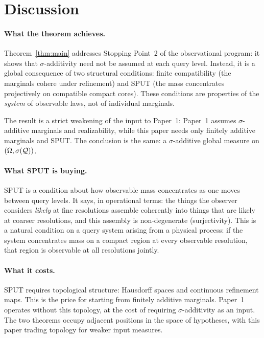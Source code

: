\section{Discussion}\label{sec:discussion}

\paragraph{What the theorem achieves.}
Theorem~\ref{thm:main} addresses Stopping Point~2 of the
observational program: it shows that $\sigma$-additivity need not
be assumed at each query level.  Instead, it is a global consequence
of two structural conditions: finite compatibility (the marginals
cohere under refinement) and SPUT (the mass concentrates
projectively on compatible compact cores).  These conditions are
properties of the \emph{system} of observable laws, not of
individual marginals.

The result is a strict weakening of the input to Paper~1:
Paper~1 assumes $\sigma$-additive marginals and realizability,
while this paper needs only finitely additive marginals and SPUT.
The conclusion is the same: a $\sigma$-additive global measure on
$(\Omega, \sigma(\mathcal{Q}))$.

\paragraph{What SPUT is buying.}
SPUT is a condition about how observable mass concentrates as one
moves between query levels.  It says, in operational terms: the
things the observer considers \emph{likely} at fine resolutions
assemble coherently into things that are likely at coarser
resolutions, and this assembly is non-degenerate (surjectivity).
This is a natural condition on a query system arising from a
physical process: if the system concentrates mass on a compact
region at every observable resolution, that region is observable
at all resolutions jointly.

\paragraph{What it costs.}
SPUT requires topological structure: Hausdorff spaces and continuous
refinement maps.  This is the price for starting from finitely
additive marginals.  Paper~1 operates without this topology, at
the cost of requiring $\sigma$-additivity as an input.  The two
theorems occupy adjacent positions in the space of hypotheses,
with this paper trading topology for weaker input measures.

